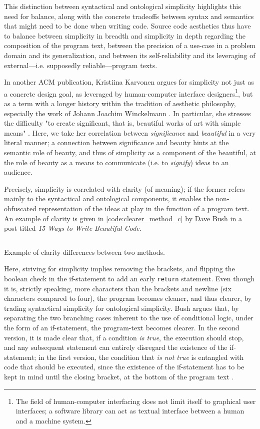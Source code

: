 This distinction between syntactical and ontological simplicity highlights this need for balance, along with the concrete tradeoffs between syntax and semantics that might need to be done when writing code. Source code aesthetics thus have to balance between simplicity in breadth and simplicity in depth regarding the composition of the program text, between the precision of a use-case in a problem domain and its generalization, and between its self-reliability and its leveraging of external—i.e. supposedly reliable—program texts. 

In another ACM publication, Kristiina Karvonen argues for simplicity not just as a concrete design goal, as leveraged by human-computer interface designers\footnote{The field of human-computer interfacing does not limit itself to graphical user interfaces; a software library can act as textual interface between a human and a machine system.}, but as a term with a longer history within the tradition of aesthetic philosophy, especially the work of Johann Joachim Winckelmann \citep{karvonen_beauty_2000}. In particular, she stresses the difficulty "to create significant, that is, beautiful works of art with simple means" \citep{karvonen_beauty_2000}. Here, we take her correlation between \emph{significance} and \emph{beautiful} in a very literal manner; a connection between significance and beauty hints at the semantic role of beauty, and thus of simplicity as a component of the beautiful, at the role of beauty as a means to communicate (i.e. to \emph{signify}) ideas to an audience.

Precisely, simplicity is correlated with clarity (of meaning); if the former refers mainly to the syntactical and ontological components, it enables the non-obfuscated representation of the ideas at play in the function of a program text. An example of clarity is given in \autoref{code:clearer_method_c} by Dave Bush in a post titled  \emph{15 Ways to Write Beautiful Code}.

\begin{listing}
  \inputminted{c}{./corpus/clearer_method.c}
  \caption{Example of clarity differences between two methods.}
  \label{code:clearer_method_c}
\end{listing}

Here, striving for simplicity implies removing the brackets, and flipping the boolean check in the if-statement to add an early \lstinline{return} statement. Even though it is, strictly speaking, more characters than the brackets and newline (six characters compared to four), the program becomes cleaner, and thus clearer, by trading syntactical simplicity for ontological simplicity. Bush argues that, by separating the two branching cases inherent to the use of conditional logic, under the form of an if-statement, the program-text becomes clearer. In the second version, it is made clear that, if a condition \emph{is true}, the execution should stop, and any subsequent statement can entirely disregard the existence of the if-statement; in the first version, the condition that \emph{is not true} is entangled with code that should be executed, since the existence of the if-statement has to be kept in mind until the closing bracket, at the bottom of the program text \citep{bush_15_2015}.

